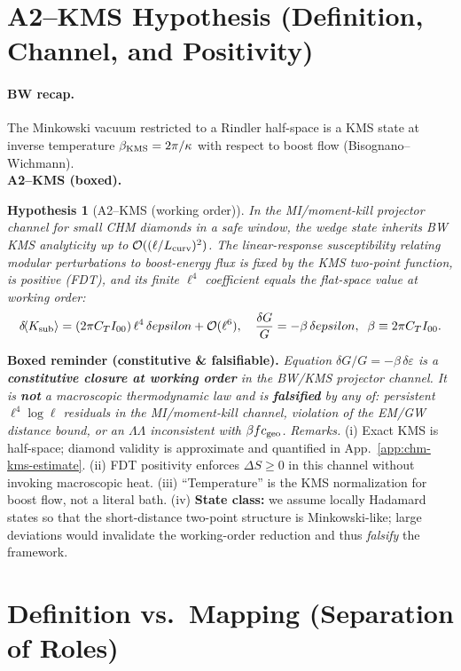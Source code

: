 \documentclass[aps,prd,onecolumn,superscriptaddress,nofootinbib]{revtex4-2}
\def\eps{epsilon}%
\def\Omega_\Lambda{OmegaLambda}%
\providecommand{\eps}{\varepsilon}
\newtheorem{hypothesis}{Hypothesis}
\begin{document}
\section{A2--KMS Hypothesis (Definition, Channel, and Positivity)}
\label{sec:A2KMS}
\paragraph{BW recap.} The Minkowski vacuum restricted to a Rindler half-space is a KMS state at inverse temperature \(\beta_{\rm KMS}=2\pi/\kappa\) with respect to boost flow (Bisognano--Wichmann).\\[3pt]
\noindent\textbf{A2--KMS (boxed).}
\begin{hypothesis}[A2--KMS (working order)]
\label{hyp:A2KMS}
In the MI/moment-kill projector channel for small CHM diamonds in a safe window, the wedge state inherits BW KMS analyticity up to \(\mathcal O((\ell/L_{\rm curv})^2)\). The linear-response susceptibility relating modular perturbations to boost-energy flux is fixed by the KMS two-point function, is positive (FDT), and its finite \(\ell^4\) coefficient equals the flat-space value at working order:
\[
\delta\!\langle K_{\rm sub}\rangle=(2\pi C_T I_{00})\,\ell^4\,\delta\eps+\mathcal O(\ell^6),\quad
\frac{\delta G}{G}=-\beta\,\delta\eps,\;\;\beta\equiv 2\pi C_T I_{00}.
\]
\end{hypothesis}
\noindent\textbf{Boxed reminder (constitutive \& falsifiable).} \emph{Equation \(\delta G/G=-\beta\,\delta\varepsilon\) is a \textbf{constitutive closure at working order} in the BW/KMS projector channel. It is \textbf{not} a macroscopic thermodynamic law and is \textbf{falsified} by any of: persistent \(\ell^4\log\ell\) residuals in the MI/moment-kill channel, violation of the EM/GW distance bound, or an \(\Omega_\Lambda\) inconsistent with \(\beta f c_{\rm geo}\).}
\noindent\emph{Remarks.} (i) Exact KMS is half-space; diamond validity is approximate and quantified in App.~\ref{app:chm-kms-estimate}. (ii) FDT positivity enforces \(\Delta S\ge 0\) in this channel without invoking macroscopic heat. (iii) ``Temperature'' is the KMS normalization for boost flow, not a literal bath. (iv) \textbf{State class:} we assume locally Hadamard states so that the short-distance two-point structure is Minkowski-like; large deviations would invalidate the working-order reduction and thus \emph{falsify} the framework.

\section{Definition vs.\ Mapping (Separation of Roles)}
\label{sec:def-vs-map}
\end{document}
